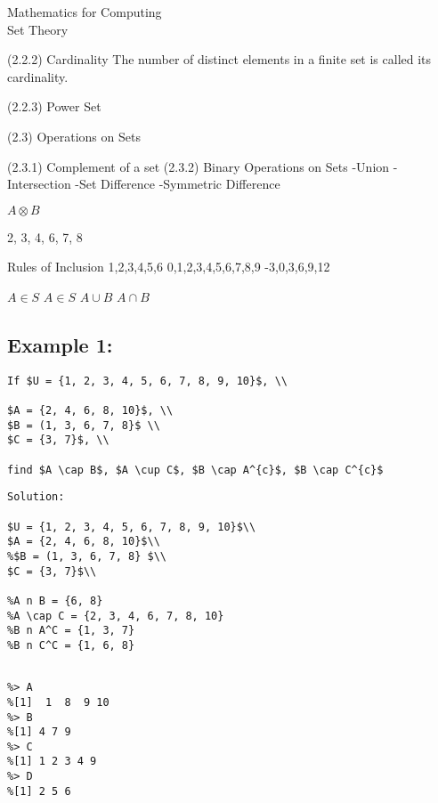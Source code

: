\documentclass[MASTER.tex]{subfiles}
\begin{document}
\begin{center}
\huge{Mathematics for Computing}\\
\LARGE{Set Theory}
\end{center}


(2.2.2) Cardinality 
The number of distinct elements in a finite set is called its cardinality.


(2.2.3) Power Set

(2.3) Operations on Sets

(2.3.1) Complement of a set
(2.3.2) Binary Operations on Sets
-Union
-Intersection
-Set Difference
-Symmetric Difference 


$ A \otimes B$

{2, 3, 4, 6, 7, 8}

Rules of Inclusion
{1,2,3,4,5,6}
{0,1,2,3,4,5,6,7,8,9}
{-3,0,3,6,9,12}

$ A \in S$
$ A \in S$
$ A \cup B$
$ A \cap B$
\subsection*{Example 1: }
\begin{verbatim}
If $U = {1, 2, 3, 4, 5, 6, 7, 8, 9, 10}$, \\

$A = {2, 4, 6, 8, 10}$, \\
$B = (1, 3, 6, 7, 8}$ \\
$C = {3, 7}$, \\

find $A \cap B$, $A \cup C$, $B \cap A^{c}$, $B \cap C^{c}$
\end{verbatim}
\begin{verbatim}
Solution: 

$U = {1, 2, 3, 4, 5, 6, 7, 8, 9, 10}$\\
$A = {2, 4, 6, 8, 10}$\\
%$B = (1, 3, 6, 7, 8} $\\
$C = {3, 7}$\\

%A n B = {6, 8}
%A \cap C = {2, 3, 4, 6, 7, 8, 10}
%B n A^C = {1, 3, 7}
%B n C^C = {1, 6, 8}
\end{verbatim}
\begin{verbatim}

%> A
%[1]  1  8  9 10
%> B
%[1] 4 7 9
%> C
%[1] 1 2 3 4 9
%> D
%[1] 2 5 6
\end{verbatim}
\end{document}
